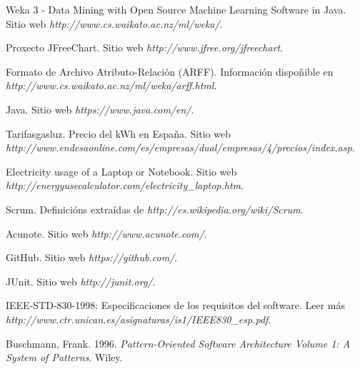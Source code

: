 

\begin{thebibliography}{99}

 Weka 3 - Data Mining with Open Source Machine Learning Software in Java. Sitio web {\it http://www.cs.waikato.ac.nz/ml/weka/}.

 Proxecto JFreeChart. Sitio web {\it http://www.jfree.org/jfreechart}.

 Formato de Archivo Atributo-Relación (ARFF). Información dispoñible en {\it http://www.cs.waikato.ac.nz/ml/weka/arff.html}.

 Java. Sitio web {\it https://www.java.com/en/}.

 Tarifasgasluz. Precio del kWh en España. Sitio web {\it http://www.endesaonline.com/es/empresas/dual/empresas/4/precios/index.asp}.

 Electricity usage of a Laptop or Notebook. Sitio web {\it http://energyusecalculator.com/electricity\_laptop.htm}.

 Scrum. Definicións extraídas de {\it http://es.wikipedia.org/wiki/Scrum}.

 Acunote. Sitio web {\it http://www.acunote.com/}.

 GitHub. Sitio web {\it https://github.com/}.

 JUnit. Sitio web {\it http://junit.org/}.

 IEEE-STD-830-1998: Especificaciones de los requisitos del software. Leer más {\it http://www.ctr.unican.es/asignaturas/is1/IEEE830_esp.pdf}.

 Buschmann, Frank. 1996. \textit{Pattern-Oriented Software Architecture Volume 1: A System of Patterns}. Wiley. 

\end{thebibliography}

